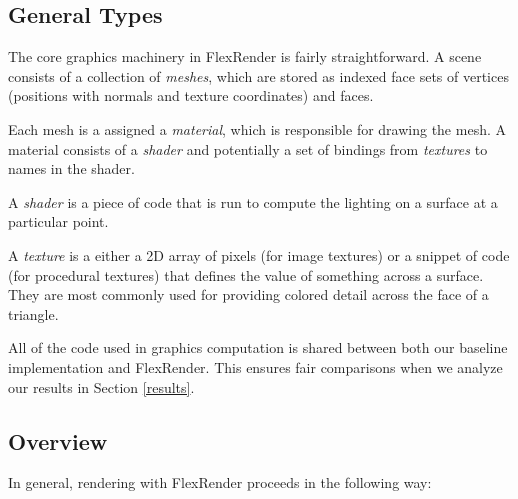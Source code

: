 \documentclass[12pt]{ucthesis}
\begin{document}
\subsection{General Types}
\label{types}

The core graphics machinery in FlexRender is fairly straightforward. A scene consists
of a collection of \emph{meshes}, which are stored as indexed face sets of vertices
(positions with normals and texture coordinates) and faces.

Each mesh is a assigned a \emph{material}, which is responsible for drawing the
mesh. A material consists of a \emph{shader} and potentially a set of bindings
from \emph{textures} to names in the shader.

A \emph{shader} is a piece of code that is run to compute the lighting on a
surface at a particular point.

A \emph{texture} is a either a 2D array of pixels (for image textures) or
a snippet of code (for procedural textures) that defines the value of
something across a surface. They are most commonly used for providing colored
detail across the face of a triangle.

All of the code used in graphics computation is shared between both our baseline
implementation and FlexRender. This ensures fair comparisons when we analyze our
results in Section \ref{results}.

\subsection{Overview}
\label{overview}

In general, rendering with FlexRender proceeds in the following way:
\end{document}
